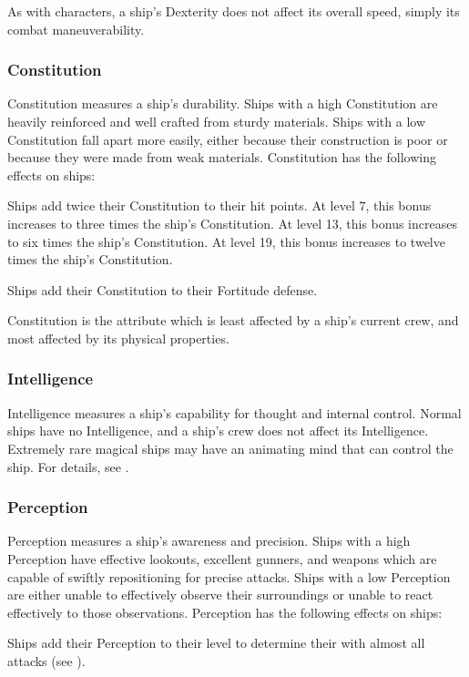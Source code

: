             As with characters, a ship's Dexterity does not affect its overall speed, simply its combat maneuverability.

        \subsubsection{Constitution}
            Constitution measures a ship's durability.
            Ships with a high Constitution are heavily reinforced and well crafted from sturdy materials.
            Ships with a low Constitution fall apart more easily, either because their construction is poor or because they were made from weak materials.
            Constitution has the following effects on ships:
            \begin{raggeditemize}
                \item Ships add twice their Constitution to their hit points.
                    At level 7, this bonus increases to three times the ship's Constitution.
                    At level 13, this bonus increases to six times the ship's Constitution.
                    At level 19, this bonus increases to twelve times the ship's Constitution.
                \item Ships add their Constitution to their Fortitude defense.
            \end{raggeditemize}

            Constitution is the attribute which is least affected by a ship's current crew, and most affected by its physical properties.

        \subsubsection{Intelligence}
            Intelligence measures a ship's capability for thought and internal control.
            Normal ships have no Intelligence, and a ship's crew does not affect its Intelligence.
            Extremely rare magical ships may have an animating mind that can control the ship.
            For details, see .

        \subsubsection{Perception}
            Perception measures a ship's awareness and precision.
            Ships with a high Perception have effective lookouts, excellent gunners, and weapons which are capable of swiftly repositioning for precise attacks.
            Ships with a low Perception are either unable to effectively observe their surroundings or unable to react effectively to those observations.
            Perception has the following effects on ships:
            \begin{raggeditemize}
                \item Ships add their Perception to their level to determine their  with almost all attacks (see ).
            \end{raggeditemize}

